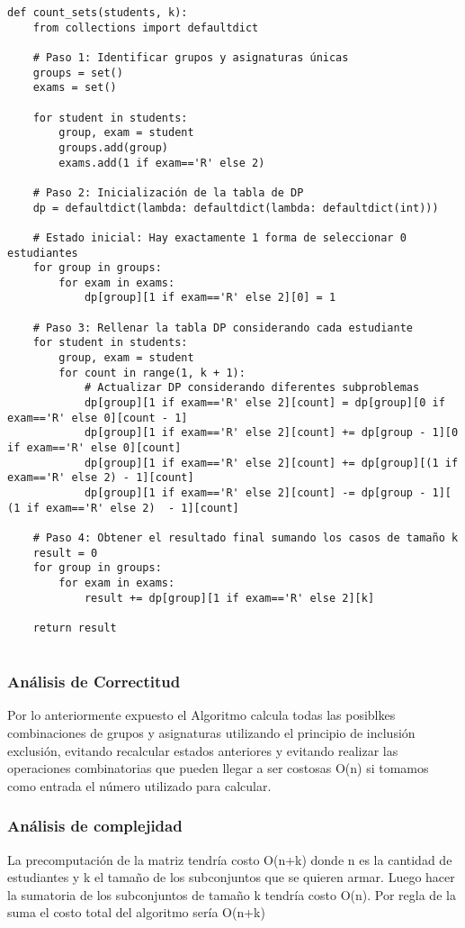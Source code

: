 \documentclass{article}
\begin{document}
\begin{lstlisting}
def count_sets(students, k):
    from collections import defaultdict

    # Paso 1: Identificar grupos y asignaturas únicas
    groups = set()
    exams = set()

    for student in students:
        group, exam = student
        groups.add(group)
        exams.add(1 if exam=='R' else 2)

    # Paso 2: Inicialización de la tabla de DP
    dp = defaultdict(lambda: defaultdict(lambda: defaultdict(int)))

    # Estado inicial: Hay exactamente 1 forma de seleccionar 0 estudiantes
    for group in groups:
        for exam in exams:
            dp[group][1 if exam=='R' else 2][0] = 1

    # Paso 3: Rellenar la tabla DP considerando cada estudiante
    for student in students:
        group, exam = student 
        for count in range(1, k + 1):
            # Actualizar DP considerando diferentes subproblemas
            dp[group][1 if exam=='R' else 2][count] = dp[group][0 if exam=='R' else 0][count - 1]
            dp[group][1 if exam=='R' else 2][count] += dp[group - 1][0 if exam=='R' else 0][count]
            dp[group][1 if exam=='R' else 2][count] += dp[group][(1 if exam=='R' else 2) - 1][count]
            dp[group][1 if exam=='R' else 2][count] -= dp[group - 1][ (1 if exam=='R' else 2)  - 1][count]

    # Paso 4: Obtener el resultado final sumando los casos de tamaño k
    result = 0
    for group in groups:
        for exam in exams:
            result += dp[group][1 if exam=='R' else 2][k]

    return result


	\end{lstlisting}

\subsubsection{Análisis de Correctitud}
Por lo anteriormente expuesto el Algoritmo calcula todas las posiblkes combinaciones de grupos y asignaturas utilizando el principio de inclusión exclusión, evitando recalcular estados anteriores y evitando realizar las operaciones combinatorias que pueden llegar a ser costosas O(n) si tomamos como entrada el número utilizado para calcular. 


\subsubsection{Análisis de complejidad}
La precomputación de la matriz tendría costo O(n+k) donde n es la cantidad de estudiantes y k el tamaño de los subconjuntos que se quieren armar. Luego hacer la sumatoria de los subconjuntos de tamaño k tendría costo O(n). Por regla de la suma el costo total del algoritmo sería O(n+k) 
\end{document}
